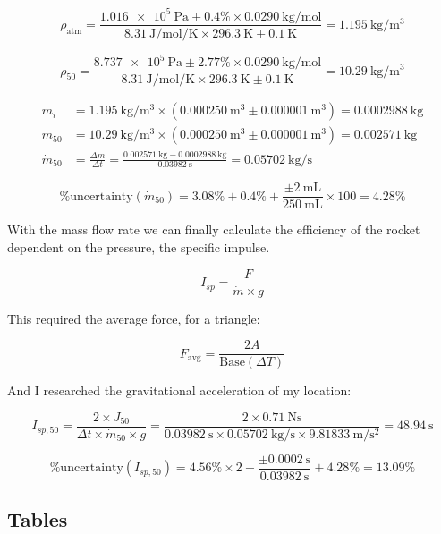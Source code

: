 \documentclass[12pt,a4paper]{article}
\begin{document}
$$\rho_{\text{atm}} = \frac{\SI{1.016e5}{\pascal} \pm 0.4\% \times \SI{0.0290}{\kilogram\per\mole}}{\SI{8.31}{\joule\per\mole\per\kelvin} \times \SI{296.3}{\kelvin} \pm \SI{0.1}{\kelvin}} = \SI{1.195}{\kilogram\per\meter\cubed}$$

$$\rho_{50} = \frac{\SI{8.737e5}{\pascal} \pm 2.77\% \times \SI{0.0290}{\kilogram\per\mole}}{\SI{8.31}{\joule\per\mole\per\kelvin} \times \SI{296.3}{\kelvin} \pm \SI{0.1}{\kelvin}} = \SI{10.29}{\kilogram\per\meter\cubed}$$

\begin{align}
m_i &= \SI{1.195}{\kilogram\per\meter\cubed} \times (\SI{0.000250}{\meter\cubed} \pm \SI{0.000001}{\meter\cubed}) = \SI{0.0002988}{\kilogram}\\
m_{50} &= \SI{10.29}{\kilogram\per\meter\cubed} \times (\SI{0.000250}{\meter\cubed} \pm \SI{0.000001}{\meter\cubed}) = \SI{0.002571}{\kilogram}\\
\dot{m}_{50} &= \frac{\Delta m}{\Delta t} = \frac{\SI{0.002571}{\kilogram} - \SI{0.0002988}{\kilogram}}{\SI{0.03982}{\second}} = \SI{0.05702}{\kilogram\per\second}
\end{align}

$$\text{\% uncertainty}(\dot{m}_{50}) = 3.08\% + 0.4\% + \frac{\pm \SI{2}{\milli\liter}}{\SI{250}{\milli\liter}} \times 100 = 4.28\%$$

With the mass flow rate we can finally calculate the efficiency of the rocket dependent on the pressure, the specific impulse.

$$I_{sp} = \frac{F}{\dot{m} \times g}$$

This required the average force, for a triangle:

$$F_{\text{avg}} = \frac{2A}{\text{Base}(\Delta T)}$$

And I researched the gravitational acceleration of my location:

$$I_{sp,50} = \frac{2 \times J_{50}}{\Delta t \times \dot{m}_{50} \times g} = \frac{2 \times \SI{0.71}{\newton\second}}{\SI{0.03982}{\second} \times \SI{0.05702}{\kilogram\per\second} \times \SI{9.81833}{\meter\per\second\squared}} = \SI{48.94}{\second}$$

$$\text{\% uncertainty}(I_{sp,50}) = 4.56\% \times 2 + \frac{\pm \SI{0.0002}{\second}}{\SI{0.03982}{\second}} + 4.28\% = 13.09\%$$

\subsection{Tables}
\end{document}
